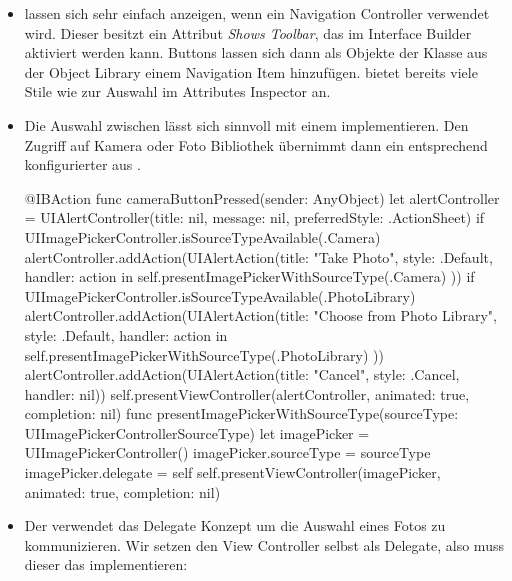\documentclass[parskip=half, final]{scrreprt}
\begin{document}
\begin{lecture}
\begin{itemize}
\item {} lassen sich sehr einfach anzeigen, wenn ein Navigation Controller verwendet wird. Dieser besitzt ein Attribut \emph{Shows Toolbar}, das im Interface Builder aktiviert werden kann. Buttons lassen sich dann als Objekte der  Klasse aus der Object Library einem Navigation Item hinzufügen.  bietet bereits viele Stile wie  zur Auswahl im Attributes Inspector an.

\item Die Auswahl zwischen  lässt sich sinnvoll mit einem  implementieren. Den Zugriff auf Kamera oder Foto Bibliothek übernimmt dann ein entsprechend konfigurierter  aus .

\begin{swiftcode}
    @IBAction func cameraButtonPressed(sender: AnyObject) {
        let alertController = UIAlertController(title: nil, message: nil, preferredStyle: .ActionSheet)
        if UIImagePickerController.isSourceTypeAvailable(.Camera) {
            alertController.addAction(UIAlertAction(title: "Take Photo", style: .Default, handler: { action in
                self.presentImagePickerWithSourceType(.Camera)
            }))
        }
        if UIImagePickerController.isSourceTypeAvailable(.PhotoLibrary) {
            alertController.addAction(UIAlertAction(title: "Choose from Photo Library", style: .Default, handler: { action in
                self.presentImagePickerWithSourceType(.PhotoLibrary)
            }))
        }
        alertController.addAction(UIAlertAction(title: "Cancel", style: .Cancel, handler: nil))
        self.presentViewController(alertController, animated: true, completion: nil)
    }
    func presentImagePickerWithSourceType(sourceType: UIImagePickerControllerSourceType) {
        let imagePicker = UIImagePickerController()
        imagePicker.sourceType = sourceType
        imagePicker.delegate = self
        self.presentViewController(imagePicker, animated: true, completion: nil)
    }
\end{swiftcode}

\item Der  verwendet das Delegate Konzept um die Auswahl eines Fotos zu kommunizieren. Wir setzen den View Controller selbst als Delegate, also muss dieser das  implementieren:


\end{itemize}
\end{lecture}
\end{document}
